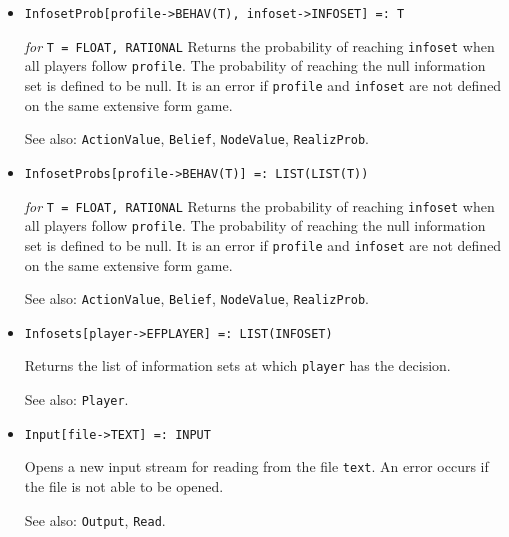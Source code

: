 \begin{itemize}
\item{}
\protect \large \begin{verbatim}
InfosetProb[profile->BEHAV(T), infoset->INFOSET] =: T
\end{verbatim}\normalsize

{\it for} {\tt T = FLOAT, RATIONAL}
\bd
Returns the probability of reaching \verb+infoset+ when all players
follow \verb+profile+.  The probability of reaching the null information
set is defined to be null.  It is an error if \verb+profile+ and
\verb+infoset+ are not defined on the same extensive form game.
\item
[See also:] \verb+ActionValue+, \verb+Belief+, \verb+NodeValue+,
\verb+RealizProb+.
\ed

\item{}
\protect \large \begin{verbatim}
InfosetProbs[profile->BEHAV(T)] =: LIST(LIST(T))
\end{verbatim}\normalsize

{\it for} {\tt T = FLOAT, RATIONAL}
\bd
Returns the probability of reaching \verb+infoset+ when all players
follow \verb+profile+.  The probability of reaching the null information
set is defined to be null.  It is an error if \verb+profile+ and
\verb+infoset+ are not defined on the same extensive form game.
\item
[See also:] \verb+ActionValue+, \verb+Belief+, \verb+NodeValue+,
\verb+RealizProb+.
\ed

\item{}
\protect \large \begin{verbatim}
Infosets[player->EFPLAYER] =: LIST(INFOSET)
\end{verbatim}\normalsize

\bd
Returns the list of information sets at which 
\verb+player+ has the decision.
\item [See also:] \verb+Player+.
\ed

\item{}
\protect \large \begin{verbatim}
Input[file->TEXT] =: INPUT
\end{verbatim}\normalsize

\bd
Opens a new input stream for reading from the file \verb+text+.  An
error occurs if the file is not able to be opened.
\item
[See also:]  \verb+Output+, \verb+Read+.
\ed



\end{itemize}

